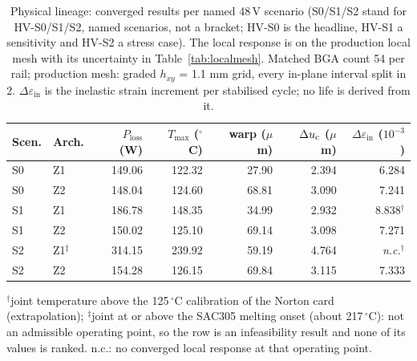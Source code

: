 \begin{table}[!t]
\caption{Physical lineage: converged results per named 48\,V scenario (S0/S1/S2 stand for HV-S0/S1/S2, named scenarios, not a bracket; HV-S0 is the headline, HV-S1 a sensitivity and HV-S2 a stress case). The local response is on the production local mesh with its uncertainty in Table~\ref{tab:localmesh}. Matched BGA count 54 per rail; production mesh: graded $h_{xy}$ = 1.1 mm grid, every in-plane interval split in 2. $\Delta\varepsilon_{\mathrm{in}}$ is the inelastic strain increment per stabilised cycle; no life is derived from it.}
\label{tab:physical}
\centering
\footnotesize
\setlength{\tabcolsep}{2.5pt}
\begin{tabular}{@{}llrrrrr@{}}
\toprule
Scen. & Arch. & $P_{\mathrm{loss}}$ (W) & $T_{\max}$ ($^\circ$C) & warp ($\mu$m) & $\Delta u_{\mathrm{c}}$ ($\mu$m) & $\Delta\varepsilon_{\mathrm{in}}$ ($10^{-3}$) \\
\midrule
S0 & Z1 & 149.06 & 122.32 & 27.90 & 2.394 & 6.284{} \\
S0 & Z2 & 148.04 & 124.60 & 68.81 & 3.090 & 7.241{} \\
S1 & Z1 & 186.78 & 148.35 & 34.99 & 2.932 & 8.838{}$^\dagger$ \\
S1 & Z2 & 150.02 & 125.10 & 69.14 & 3.098 & 7.271{} \\
S2 & Z1$^\ddagger$ & 314.15 & 239.92 & 59.19 & 4.764 & \emph{n.c.}{}$^\dagger$ \\
S2 & Z2 & 154.28 & 126.15 & 69.84 & 3.115 & 7.333{} \\
\bottomrule
\end{tabular}
\par\smallskip\raggedright $^\dagger$joint temperature above the 125\,$^\circ$C calibration of the Norton card (extrapolation); $^\ddagger$joint at or above the SAC305 melting onset (about 217\,$^\circ$C): not an admissible operating point, so the row is an infeasibility result and none of its values is ranked. n.c.: no converged local response at that operating point.
\end{table}
